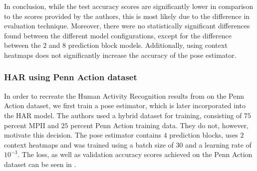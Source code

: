 
\begin{table}[]
    \centering
    \caption{Our recreation in direct comparison to the original work by \cite{luvizon_2d/3d_2018}. Values represent PCKh using $\alpha = 0.5$.  } %
    \label{tab:mpii_test}
\end{table}

In conclusion, while the test accuracy scores are significantly lower in comparison to the scores provided by the authors, this is most likely due to the difference in evaluation technique.
Moreover, there were no statistically significant differences found between the different model configurations, except for the difference between the $2$ and $8$ prediction block models.
Additionally, using context heatmaps does not significantly increase the accuracy of the pose estimator.

\subsubsection{HAR using Penn Action dataset}
In order to recreate the Human Activity Recognition results from \cite{luvizon_2d/3d_2018} on the Penn Action dataset, we first train a pose estimator, which is later incorporated into the HAR model.
The authors used a hybrid dataset for training, consisting of $75$ percent MPII and $25$ percent Penn Action training data.
They do not, however, motivate this decision.
The pose estimator contains $4$ prediction blocks, uses $2$ context heatmaps and was trained using a batch size of $30$ and a learning rate of $10^{-3}$.
The loss, as well as validation accuracy scores achieved on the Penn Action dataset can be seen in .

